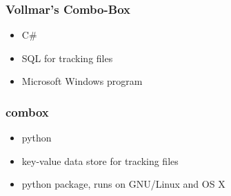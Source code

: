 \begin{frame}
  \frametitle{Vollmar's Combo-Box}

  \begin{itemize}
  \item<1-> C\#
  \item<2-> SQL for tracking files
  \item<3-> Microsoft Windows program
  \end{itemize}

\end{frame}

\begin{frame}
  \frametitle{combox}

  \begin{itemize}
  \item<1-> python
  \item<2-> key-value data store for tracking files
  \item<3-> python package, runs on GNU/Linux and OS X
  \end{itemize}
\end{frame}